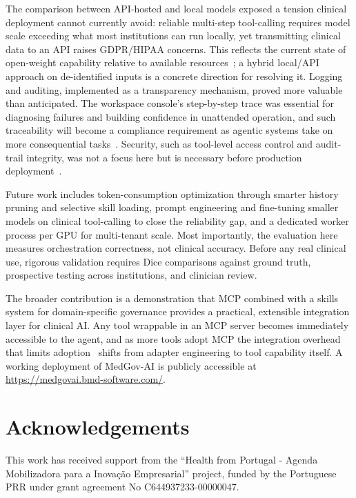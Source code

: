 \documentclass[preprint,12pt]{elsarticle}
\begin{document}
The comparison between API-hosted and local models exposed a tension clinical deployment cannot currently avoid: reliable multi-step tool-calling requires model scale exceeding what most institutions can run locally, yet transmitting clinical data to an API raises GDPR/HIPAA concerns. This reflects the current state of open-weight capability relative to available resources~\cite{agiformedicalimaging2025}; a hybrid local/API approach on de-identified inputs is a concrete direction for resolving it. Logging and auditing, implemented as a transparency mechanism, proved more valuable than anticipated. The workspace console's step-by-step trace was essential for diagnosing failures and building confidence in unattended operation, and such traceability will become a compliance requirement as agentic systems take on more consequential tasks~\cite{trustworthyai2025, dietrich2025agentic}. Security, such as tool-level access control and audit-trail integrity, was not a focus here but is necessary before production deployment~\cite{transformingclinical2026}.

Future work includes token-consumption optimization through smarter history pruning and selective skill loading, prompt engineering and fine-tuning smaller models on clinical tool-calling to close the reliability gap, and a dedicated worker process per GPU for multi-tenant scale. Most importantly, the evaluation here measures orchestration correctness, not clinical accuracy. Before any real clinical use, rigorous validation requires Dice comparisons against ground truth, prospective testing across institutions, and clinician review. 

The broader contribution is a demonstration that MCP combined with a skills system for domain-specific governance provides a practical, extensible integration layer for clinical AI. Any tool wrappable in an MCP server becomes immediately accessible to the agent, and as more tools adopt MCP the integration overhead that limits adoption~\cite{collaco2026scoping} shifts from adapter engineering to tool capability itself. A working deployment of MedGov-AI is publicly accessible at \url{https://medgovai.bmd-software.com/}.

\section{Acknowledgements}
This work has received support from the “Health from Portugal - Agenda Mobilizadora para a Inovação Empresarial” project, funded by the Portuguese PRR under grant agreement No C644937233-00000047.



\end{document}
